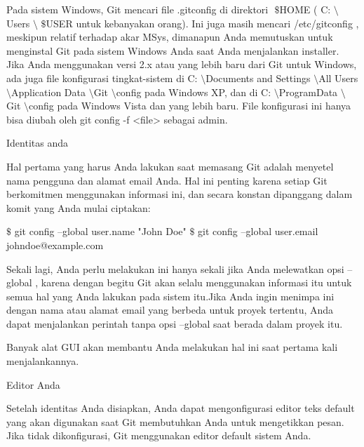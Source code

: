 \noindent 
Pada sistem Windows, Git mencari file $  $.gitconfig $  $di direktori $  $ $  \$  $HOME $  $( $  $C: $  \setminus  $Users $  \setminus  $ $  \$  $USER $  $untuk kebanyakan orang). $  $Ini juga masih mencari $  $/etc/gitconfig $  $, meskipun relatif terhadap akar MSys, dimanapun Anda memutuskan untuk menginstal Git pada sistem Windows Anda saat Anda menjalankan installer. $  $Jika Anda menggunakan versi 2.x atau yang lebih baru dari Git untuk Windows, ada juga file konfigurasi tingkat-sistem di $  $C: $  \setminus  $Documents and Settings $  \setminus  $All Users $  \setminus  $Application Data $  \setminus  $Git $  \setminus  $config $  $pada Windows XP, dan di $  $C: $  \setminus  $ProgramData $  \setminus  $Git $  \setminus  $config $  $pada Windows Vista dan yang lebih baru. $  $File konfigurasi ini hanya bisa diubah oleh $  $git config -f <file> $  $sebagai admin. \par
\vspace{12pt}
\noindent 
Identitas anda \par
\vspace{12pt}
\noindent 
Hal pertama yang harus Anda lakukan saat memasang Git adalah menyetel nama pengguna dan alamat email Anda. $  $Hal ini penting karena setiap Git berkomitmen menggunakan informasi ini, dan secara konstan dipanggang dalam komit yang Anda mulai ciptakan: \par
\vspace{12pt}
\noindent 
  $  \$  $ git config --global user.name "John Doe"  $  \$  $ git config --global user.email johndoe@example.com \par
\vspace{12pt}
\noindent 
Sekali lagi, Anda perlu melakukan ini hanya sekali jika Anda melewatkan opsi $  $--global $  $, karena dengan begitu Git akan selalu menggunakan informasi itu untuk semua hal yang Anda lakukan pada sistem itu.Jika Anda ingin menimpa ini dengan nama atau alamat email yang berbeda untuk proyek tertentu, Anda dapat menjalankan perintah tanpa opsi $  $--global $  $saat berada dalam proyek itu. \par
\vspace{12pt}
\noindent 
Banyak alat GUI akan membantu Anda melakukan hal ini saat pertama kali menjalankannya. \par
\vspace{12pt}
\noindent 
Editor Anda \par
\vspace{12pt}
\noindent 
Setelah identitas Anda disiapkan, Anda dapat mengonfigurasi editor teks default yang akan digunakan saat Git membutuhkan Anda untuk mengetikkan pesan. $  $Jika tidak dikonfigurasi, Git menggunakan editor default sistem Anda. \par
